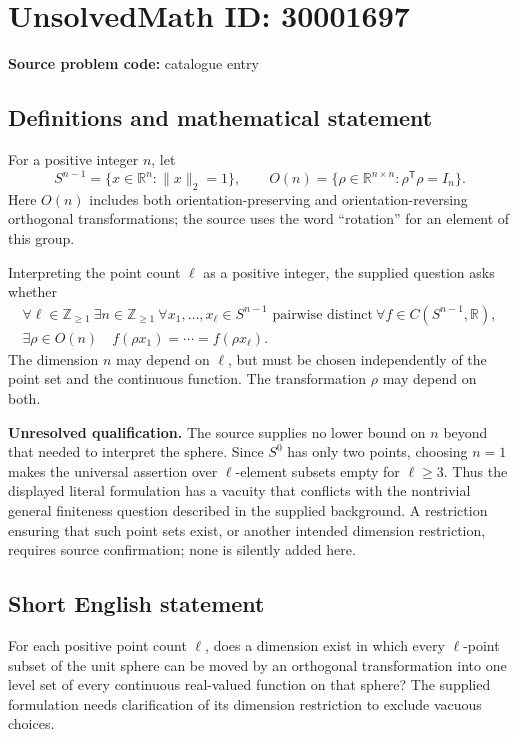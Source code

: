 \documentclass[11pt]{article}
\newcommand{\Z}{\mathbb{Z}}
\newcommand{\R}{\mathbb{R}}
\begin{document}
\section*{UnsolvedMath ID: 30001697}
\textbf{Source problem code:} catalogue entry
\subsection{Definitions and mathematical statement}
For a positive integer \(n\), let
\[
S^{n-1}=\{x\in\R^n:\|x\|_2=1\},\qquad
O(n)=\{\rho\in\R^{n\times n}:\rho^{\mathsf T}\rho=I_n\}.
\]
Here \(O(n)\) includes both orientation-preserving and orientation-reversing orthogonal transformations; the source uses the word ``rotation'' for an element of this group.

Interpreting the point count \(\ell\) as a positive integer, the supplied question asks whether
\[
\begin{gathered}
\forall\ell\in\Z_{\geq1}\ \exists n\in\Z_{\geq1}\ 
\forall x_1,\ldots,x_\ell\in S^{n-1}\text{ pairwise distinct}\ 
\forall f\in C(S^{n-1},\R),\\
\exists\rho\in O(n)\quad
f(\rho x_1)=\cdots=f(\rho x_\ell).
\end{gathered}
\]
The dimension \(n\) may depend on \(\ell\), but must be chosen independently of the point set and the continuous function. The transformation \(\rho\) may depend on both.

\textbf{Unresolved qualification.} The source supplies no lower bound on \(n\) beyond that needed to interpret the sphere. Since \(S^0\) has only two points, choosing \(n=1\) makes the universal assertion over \(\ell\)-element subsets empty for \(\ell\geq3\). Thus the displayed literal formulation has a vacuity that conflicts with the nontrivial general finiteness question described in the supplied background. A restriction ensuring that such point sets exist, or another intended dimension restriction, requires source confirmation; none is silently added here.
\subsection{Short English statement}
For each positive point count \(\ell\), does a dimension exist in which every \(\ell\)-point subset of the unit sphere can be moved by an orthogonal transformation into one level set of every continuous real-valued function on that sphere? The supplied formulation needs clarification of its dimension restriction to exclude vacuous choices.
\end{document}
